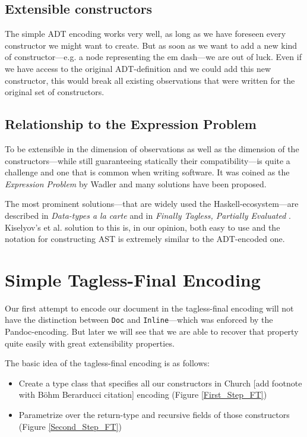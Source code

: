 \clearpage

\subsection{Extensible constructors}

The simple ADT encoding works very well, as long as we have foreseen every
constructor we might want to create. But as soon as we want to add a new kind of
constructor—e.g. a node representing the em dash—we are out of luck. Even if we
have access to the original ADT-definition and we could add this new
constructor, this would break all existing observations that were written for
the original set of constructors.

\subsection{Relationship to the Expression Problem}

To be extensible in the dimension of observations as well as the dimension of
the constructors—while still guaranteeing statically their compatibility—is
quite a challenge and one that is common when writing software. It was coined as
the \emph{Expression Problem} by Wadler \cite{expression-problem} and many
solutions have been proposed.

The most prominent solutions—that are widely used the Haskell-ecosystem—are
described in \emph{Data-types a la carte} \cite{data-types-a-la-carte} and in
\emph{Finally Tagless, Partially Evaluated} \cite{finally-tagless}. Kiselyov’s
et al. solution to this is, in our opinion, both easy to use and the notation
for constructing AST is extremely similar to the ADT-encoded one.


\section{Simple Tagless-Final Encoding}

Our first attempt to encode our document in the tagless-final encoding will not
have the distinction between \texttt{Doc} and \texttt{Inline}—which was enforced
by the Pandoc-encoding. But later we will see that we are able to recover that
property quite easily with great extensibility properties.

The basic idea of the tagless-final encoding is as follows:

\begin{itemize}
\item Create a type class that specifies all our constructors in Church [add
  footnote with Böhm Berarducci citation] encoding (Figure \ref{First_Step_FT})
\item Parametrize over the return-type and recursive fields of those
  constructors (Figure \ref{Second_Step_FT})
\end{itemize}


